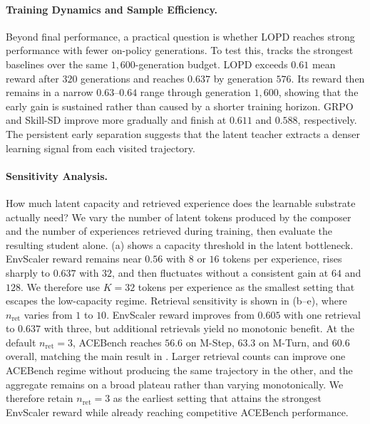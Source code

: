 \documentclass{article} %
\newcommand{\ourmethod}{{\textsc{LOPD}}\xspace}
\begin{document}
\vspace{-0.4em}
\paragraph{Training Dynamics and Sample Efficiency.}
Beyond final performance, a practical question is whether \ourmethod reaches strong performance with fewer on-policy generations. To test this,  tracks the strongest baselines over the same $1{,}600$-generation budget. \ourmethod exceeds $0.61$ mean reward after $320$ generations and reaches $0.637$ by generation $576$. Its reward then remains in a narrow $0.63$--$0.64$ range through generation $1{,}600$, showing that the early gain is sustained rather than caused by a shorter training horizon. GRPO and Skill-SD improve more gradually and finish at $0.611$ and $0.588$, respectively. The persistent early separation suggests that the latent teacher extracts a denser learning signal from each visited trajectory.

\vspace{-0.4em}
\paragraph{Sensitivity Analysis.}
How much latent capacity and retrieved experience does the learnable substrate actually need? We vary the number of latent tokens produced by the composer and the number of experiences retrieved during training, then evaluate the resulting student alone. (a) shows a capacity threshold in the latent bottleneck. EnvScaler reward remains near $0.56$ with $8$ or $16$ tokens per experience, rises sharply to $0.637$ with $32$, and then fluctuates without a consistent gain at $64$ and $128$. We therefore use $K{=}32$ tokens per experience as the smallest setting that escapes the low-capacity regime. Retrieval sensitivity is shown in (b--e), where $n_{\mathrm{ret}}$ varies from $1$ to $10$. EnvScaler reward improves from $0.605$ with one retrieval to $0.637$ with three, but additional retrievals yield no monotonic benefit. At the default $n_{\mathrm{ret}}{=}3$, ACEBench reaches $56.6$ on M-Step, $63.3$ on M-Turn, and $60.6$ overall, matching the main result in . Larger retrieval counts can improve one ACEBench regime without producing the same trajectory in the other, and the aggregate remains on a broad plateau rather than varying monotonically. We therefore retain $n_{\mathrm{ret}}{=}3$ as the earliest setting that attains the strongest EnvScaler reward while already reaching competitive ACEBench performance.
\end{document}
